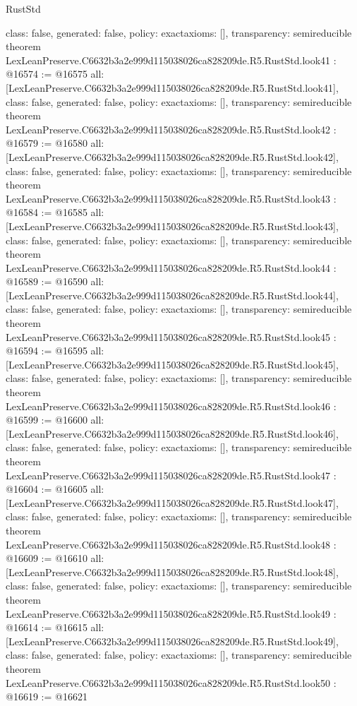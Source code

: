 \begin{lexlean}{RustStd}
\begin{coremodule}
{  class: false,
  generated: false,
  policy: exact{axioms: []},
  transparency: semireducible
}
theorem LexLeanPreserve.C6632b3a2e999d115038026ca828209de.R5.RustStd.look41 : @16574 := @16575 {
  all: [LexLeanPreserve.C6632b3a2e999d115038026ca828209de.R5.RustStd.look41],
  class: false,
  generated: false,
  policy: exact{axioms: []},
  transparency: semireducible
}
theorem LexLeanPreserve.C6632b3a2e999d115038026ca828209de.R5.RustStd.look42 : @16579 := @16580 {
  all: [LexLeanPreserve.C6632b3a2e999d115038026ca828209de.R5.RustStd.look42],
  class: false,
  generated: false,
  policy: exact{axioms: []},
  transparency: semireducible
}
theorem LexLeanPreserve.C6632b3a2e999d115038026ca828209de.R5.RustStd.look43 : @16584 := @16585 {
  all: [LexLeanPreserve.C6632b3a2e999d115038026ca828209de.R5.RustStd.look43],
  class: false,
  generated: false,
  policy: exact{axioms: []},
  transparency: semireducible
}
theorem LexLeanPreserve.C6632b3a2e999d115038026ca828209de.R5.RustStd.look44 : @16589 := @16590 {
  all: [LexLeanPreserve.C6632b3a2e999d115038026ca828209de.R5.RustStd.look44],
  class: false,
  generated: false,
  policy: exact{axioms: []},
  transparency: semireducible
}
theorem LexLeanPreserve.C6632b3a2e999d115038026ca828209de.R5.RustStd.look45 : @16594 := @16595 {
  all: [LexLeanPreserve.C6632b3a2e999d115038026ca828209de.R5.RustStd.look45],
  class: false,
  generated: false,
  policy: exact{axioms: []},
  transparency: semireducible
}
theorem LexLeanPreserve.C6632b3a2e999d115038026ca828209de.R5.RustStd.look46 : @16599 := @16600 {
  all: [LexLeanPreserve.C6632b3a2e999d115038026ca828209de.R5.RustStd.look46],
  class: false,
  generated: false,
  policy: exact{axioms: []},
  transparency: semireducible
}
theorem LexLeanPreserve.C6632b3a2e999d115038026ca828209de.R5.RustStd.look47 : @16604 := @16605 {
  all: [LexLeanPreserve.C6632b3a2e999d115038026ca828209de.R5.RustStd.look47],
  class: false,
  generated: false,
  policy: exact{axioms: []},
  transparency: semireducible
}
theorem LexLeanPreserve.C6632b3a2e999d115038026ca828209de.R5.RustStd.look48 : @16609 := @16610 {
  all: [LexLeanPreserve.C6632b3a2e999d115038026ca828209de.R5.RustStd.look48],
  class: false,
  generated: false,
  policy: exact{axioms: []},
  transparency: semireducible
}
theorem LexLeanPreserve.C6632b3a2e999d115038026ca828209de.R5.RustStd.look49 : @16614 := @16615 {
  all: [LexLeanPreserve.C6632b3a2e999d115038026ca828209de.R5.RustStd.look49],
  class: false,
  generated: false,
  policy: exact{axioms: []},
  transparency: semireducible
}
theorem LexLeanPreserve.C6632b3a2e999d115038026ca828209de.R5.RustStd.look50 : @16619 := @16621 {
}
\end{coremodule}
\end{lexlean}
